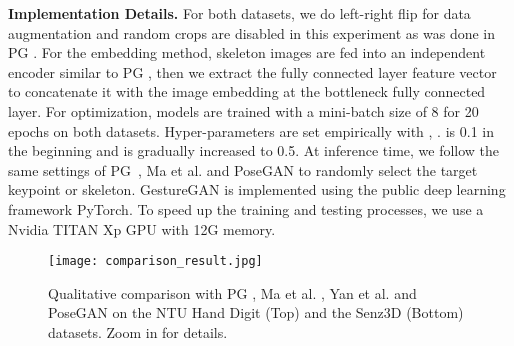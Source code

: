 \documentclass[sigconf]{acmart}
\begin{document}
\noindent\textbf{Implementation Details.}
For both datasets, we do left-right flip for data augmentation and random crops are disabled in this experiment as was done in PG \cite{ma2017pose}.
For the embedding method, skeleton images are fed into an independent encoder similar to PG \cite{ma2017pose},  then we extract the fully connected layer feature vector to concatenate it with the image embedding at the bottleneck fully connected layer.
For optimization, models are trained with a mini-batch size of 8 for 20 epochs on both datasets.
Hyper-parameters are set empirically with ,  .
 is 0.1 in the beginning and is gradually increased to 0.5.
At inference time, we follow the same settings of PG~\cite{ma2017pose}, Ma et al. \cite{ma2017disentangled} and PoseGAN \cite{siarohin2017deformable} to randomly select the target keypoint or skeleton.
GestureGAN is implemented using the public deep learning framework PyTorch.
To speed up the training and testing processes, we use a Nvidia TITAN Xp GPU with 12G memory.

\begin{figure*}[!t] \tiny
	\centering
	\texttt{[image: comparison\_result.jpg]}
	\caption{Qualitative comparison with PG \cite{ma2017pose}, Ma et al. \cite{ma2017disentangled}, Yan et al. \cite{yan2017skeleton} and PoseGAN \cite{siarohin2017deformable} on the NTU Hand Digit (Top) and the Senz3D (Bottom) datasets. Zoom in for details.}
	\label{fig:comparsion}
\end{figure*}
\end{document}
